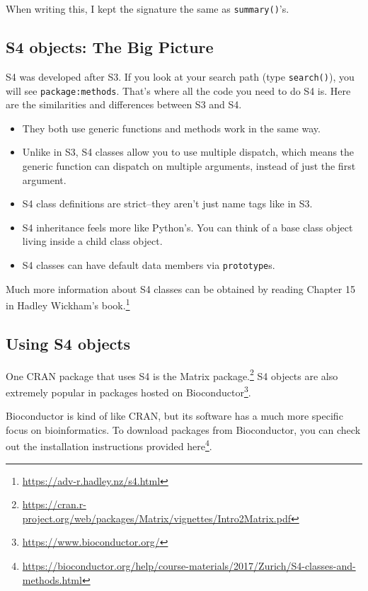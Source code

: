 \documentclass[
  12pt,
  krantz2]{krantz}
\providecommand{\tightlist}{%
  \setlength{\itemsep}{0pt}\setlength{\parskip}{0pt}}
\renewcommand{\href}[2]{#2\footnote{\url{#1}}}
\newenvironment{rmd-details}{\begin{lrbox}{\rmdbox}
  \minipage[c]{\dimexpr \textwidth-2\fboxrule-\wd\bulb-\columnsep}
    \vspace*{\columnsep}}%
{\vspace*{\columnsep}\endminipage\end{lrbox}%
  {\par\color{green}\fboxsep=0pt
    \fbox{\usebox\bulb\usebox\rmdbox\hspace{\columnsep}}\par}}
\begin{document}
When writing this, I kept the signature the same as \texttt{summary()}'s.

\hypertarget{s4-objects-the-big-picture}{%
\subsection{S4 objects: The Big Picture}\label{s4-objects-the-big-picture}}

S4 was developed after S3. If you look at your search path (type \texttt{search()}), you will see \texttt{package:methods}. That's where all the code you need to do S4 is. Here are the similarities and differences between S3 and S4.

\begin{itemize}
\tightlist
\item
  They both use generic functions and methods work in the same way.
\item
  Unlike in S3, S4 classes allow you to use multiple dispatch, which means the generic function can dispatch on multiple arguments, instead of just the first argument.
\item
  S4 class definitions are strict--they aren't just name tags like in S3.
\item
  S4 inheritance feels more like Python's. You can think of a base class object living inside a child class object.
\item
  S4 classes can have default data members via \texttt{prototype}s.
\end{itemize}

Much more information about S4 classes can be obtained by reading \href{https://adv-r.hadley.nz/s4.html}{Chapter 15 in Hadley Wickham's book.}

\hypertarget{using-s4-objects}{%
\subsection{Using S4 objects}\label{using-s4-objects}}

One CRAN package that uses S4 is the \href{https://cran.r-project.org/web/packages/Matrix/vignettes/Intro2Matrix.pdf}{Matrix package.} S4 objects are also extremely popular in packages hosted on \href{https://www.bioconductor.org/}{Bioconductor}.

\begin{rmd-details}
Bioconductor is kind of like CRAN, but its software has a much more specific focus on bioinformatics. To download packages from Bioconductor, you can check out the installation instructions provided \href{https://bioconductor.org/help/course-materials/2017/Zurich/S4-classes-and-methods.html}{here}.

\end{rmd-details}
\end{document}
